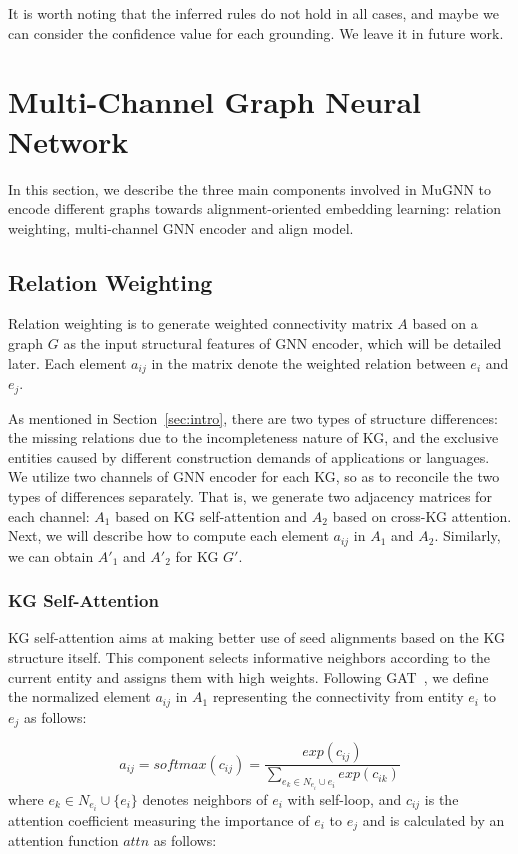 \documentclass[11pt,a4paper]{article}
\begin{document}
It is worth noting that the inferred rules do not hold in all cases, and maybe we can consider the confidence value for each grounding. We leave it in future work.

\section{Multi-Channel Graph Neural Network}
In this section, we describe the three main components involved in MuGNN to encode different graphs towards alignment-oriented embedding learning: relation weighting, multi-channel GNN encoder and align model.

\subsection{Relation Weighting}
Relation weighting is to generate weighted connectivity matrix $A$ based on a graph $G$ as the input structural features of GNN encoder, which will be detailed later. Each element $a_{ij}$ in the matrix denote the weighted relation between $e_i$ and $e_j$.

As mentioned in Section~\ref{sec:intro}, there are two types of structure differences: the missing relations due to the incompleteness nature of KG, and the exclusive entities caused by different construction demands of applications or languages. We utilize two channels of GNN encoder for each KG, so as to reconcile the two types of differences separately. That is, we generate two adjacency matrices for each channel: $A_1$ based on KG self-attention and $A_2$ based on cross-KG attention. Next, we will describe how to compute each element $a_{ij}$ in $A_1$ and $A_2$. Similarly, we can obtain $A'_1$ and $A'_2$ for KG $G'$.

\subsubsection*{KG Self-Attention}
KG self-attention aims at making better use of seed alignments based on the KG structure itself. This component selects informative neighbors according to the current entity and assigns them with high weights. Following GAT~\cite{velivckovic2018graph}, we define the normalized element $a_{ij}$ in $A_1$ representing the connectivity from entity $e_i$ to $e_j$ as follows:

\begin{equation}
	a_{ij} = softmax(c_{ij}) = \frac{exp(c_{ij})}{\sum_{e_k \in N_{e_i}\cup{e_i}} exp(c_{ik})}
\end{equation}
where $e_k \in N_{e_i} \cup \{e_i\}$ denotes neighbors of $e_i$ with self-loop, and $c_{ij}$ is the attention coefficient measuring the importance of $e_i$ to $e_j$ and is calculated by an attention function $attn$ as follows:
\end{document}
